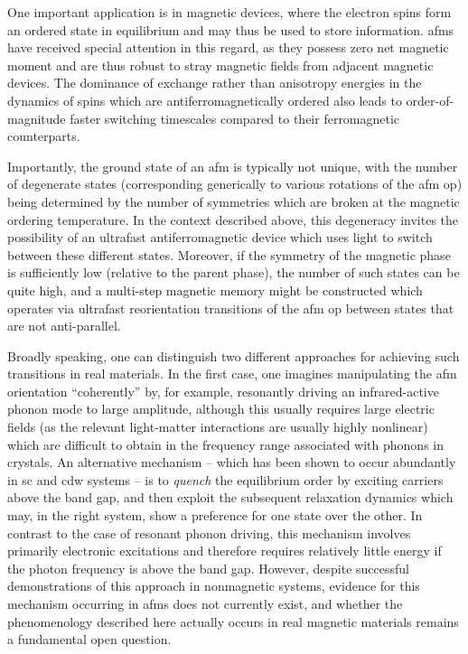 One important application is in magnetic devices, where the electron spins form an ordered state in equilibrium and may thus be used to store information.
\Glspl{afm} have received special attention in this regard, as they possess zero net magnetic moment and are thus robust to stray magnetic fields from adjacent magnetic devices\citep{jungwirth_antiferromagnetic_2016}.
The dominance of exchange rather than anisotropy energies in the dynamics of spins which are antiferromagnetically ordered also leads to order-of-magnitude faster switching timescales compared to their ferromagnetic counterparts\citep{nemec_antiferromagnetic_2018}.

Importantly, the ground state of an \gls{afm} is typically not unique, with the number of degenerate states (corresponding generically to various rotations of the \gls{afm} \gls{op}) being determined by the number of symmetries which are broken at the magnetic ordering temperature.
In the context described above, this degeneracy invites the possibility of an ultrafast antiferromagnetic device which uses light to switch between these different states.
Moreover, if the symmetry of the magnetic phase is sufficiently low (relative to the parent phase), the number of such states can be quite high, and a multi-step magnetic memory might be constructed which operates via ultrafast reorientation transitions of the \gls{afm} \gls{op} between states that are not anti-parallel.

Broadly speaking, one can distinguish two different approaches for achieving such transitions in real materials.
In the first case, one imagines manipulating the \gls{afm} orientation ``coherently'' by, for example, resonantly driving an infrared-active phonon mode to large amplitude, although this usually requires large electric fields (as the relevant light-matter interactions are usually highly nonlinear\citep{afanasiev_ultrafast_2021}) which are difficult to obtain in the frequency range associated with phonons in crystals.
An alternative mechanism -- which has been shown to occur abundantly in \gls{sc}\citep{fausti_light-induced_2011} and \gls{cdw}\citep{kogar_light-induced_2020} systems -- is to \textit{quench} the equilibrium order by exciting carriers above the band gap, and then exploit the subsequent relaxation dynamics which may, in the right system, show a preference for one state over the other\citep{sun_transient_2020}.
In contrast to the case of resonant phonon driving, this mechanism involves primarily electronic excitations and therefore requires relatively little energy if the photon frequency is above the band gap.
However, despite successful demonstrations of this approach in nonmagnetic systems\citep{fausti_light-induced_2011,kogar_light-induced_2020}, evidence for this mechanism occurring in \glspl{afm} does not currently exist, and whether the phenomenology described here actually occurs in real magnetic materials remains a fundamental open question.

